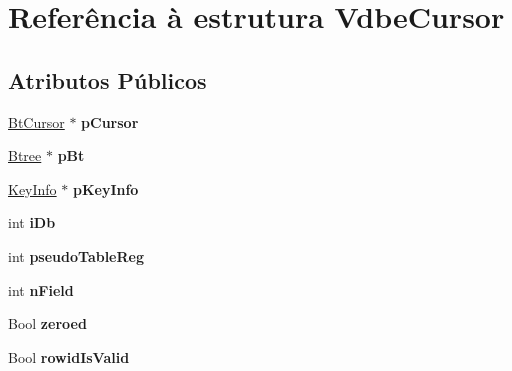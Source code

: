 \hypertarget{struct_vdbe_cursor}{\section{Referência à estrutura Vdbe\-Cursor}
\label{struct_vdbe_cursor}
}
\subsection*{Atributos Públicos}
\begin{DoxyCompactItemize}
\item 
\hypertarget{struct_vdbe_cursor_a9ecb4ab9f7374f92da69f03fc336c293}{\hyperlink{struct_bt_cursor}{Bt\-Cursor} $\ast$ {\bfseries p\-Cursor}}\label{struct_vdbe_cursor_a9ecb4ab9f7374f92da69f03fc336c293}

\item 
\hypertarget{struct_vdbe_cursor_a287db3fe6d84102fad3d69494b565e9b}{\hyperlink{struct_btree}{Btree} $\ast$ {\bfseries p\-Bt}}\label{struct_vdbe_cursor_a287db3fe6d84102fad3d69494b565e9b}

\item 
\hypertarget{struct_vdbe_cursor_a72a6c26ab2ab2ad699dfb45703ea4765}{\hyperlink{struct_key_info}{Key\-Info} $\ast$ {\bfseries p\-Key\-Info}}\label{struct_vdbe_cursor_a72a6c26ab2ab2ad699dfb45703ea4765}

\item 
\hypertarget{struct_vdbe_cursor_a1215b7b0d1bbd882d6bfb8b118712d89}{int {\bfseries i\-Db}}\label{struct_vdbe_cursor_a1215b7b0d1bbd882d6bfb8b118712d89}

\item 
\hypertarget{struct_vdbe_cursor_a8618d7c5669c83856e95b8ef72ef67b7}{int {\bfseries pseudo\-Table\-Reg}}\label{struct_vdbe_cursor_a8618d7c5669c83856e95b8ef72ef67b7}

\item 
\hypertarget{struct_vdbe_cursor_aa115a60e335e738945127141303eaedb}{int {\bfseries n\-Field}}\label{struct_vdbe_cursor_aa115a60e335e738945127141303eaedb}

\item 
\hypertarget{struct_vdbe_cursor_abcc5ef422583a743105243e2a0c7859e}{Bool {\bfseries zeroed}}\label{struct_vdbe_cursor_abcc5ef422583a743105243e2a0c7859e}

\item 
\hypertarget{struct_vdbe_cursor_a2dabf623f6e3c31aa8310c72ec1843bf}{Bool {\bfseries rowid\-Is\-Valid}}\label{struct_vdbe_cursor_a2dabf623f6e3c31aa8310c72ec1843bf}


\end{DoxyCompactItemize}
